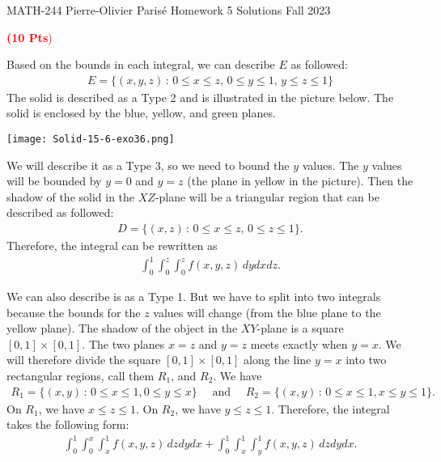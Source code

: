 \documentclass[12pt]{article}
\newcommand{\spc}{\vspace*{0.5cm}}
\newcommand{\exo}[3]{\noindent\textcolor{red}{\fbox{\textbf{Section {#1}, Problem {#2}}}\hrulefill   \textbf{({#3} Pts})}\vspace*{10pt}}
\begin{document}
\thispagestyle{empty}
	\noindent \hrulefill \newline
	MATH-244 \hfill Pierre-Olivier Paris{\'e}\newline
	Homework 5 Solutions \hfill Fall 2023\newline \vspace*{-0.7cm}
	
	\noindent\hrulefill
	
	\spc
	
	\exo{15.6}{36}{10}

	Based on the bounds in each integral, we can describe $E$ as followed:
		\begin{align*}
		E = \{ (x, y ,z) \, : \, 0 \leq x \leq z , \, 0 \leq y \leq 1 , \, y \leq z \leq 1 \}
		\end{align*} 
	The solid is described as a Type 2 and is illustrated in the picture below. The solid is enclosed by the blue, yellow, and green planes.
	\begin{center}
		\texttt{[image: Solid-15-6-exo36.png]}
	\end{center}

	We will describe it as a Type 3, so we need to bound the $y$ values. The $y$ values will be bounded by $y = 0$ and $y = z$ (the plane in yellow in the picture). Then the shadow of the solid in the $XZ$-plane will be a triangular region that can be described as followed: 
		\begin{align*}
		D = \{ (x, z) \, : \, 0 \leq x \leq z , \, 0 \leq z \leq 1 \} .
		\end{align*} 
	Therefore, the integral can be rewritten as
		\begin{align*}
		\int_0^1 \int_0^z \int_0^z f (x, y, z) \, dy dx dz .
		\end{align*}

	We can also describe is as a Type 1. But we have to split into two integrals because the bounds for the $z$ values will change (from the blue plane to the yellow plane). The shadow of the object in the $XY$-plane is a square $[0, 1] \times [0, 1]$. The two planes $x = z$ and $y = z$ meets exactly when $y = x$. We will therefore divide the square $[0, 1] \times [0 , 1]$ along the line $y =x$ into two rectangular regions, call them $R_1$, and $R_2$. We have
		\begin{align*}
		R_1 = \{ (x, y) \, : \, 0 \leq x \leq 1 , 0 \leq y \leq x \} \quad \text{ and } \quad R_2 = \{ (x, y) \, : \, 0 \leq x \leq 1 , x \leq y \leq 1 \} .
		\end{align*} 
	On $R_1$, we have $x \leq z \leq 1$. On $R_2$, we have $y \leq z \leq 1$. Therefore, the integral takes the following form:
		\begin{align*}
		\int_0^1 \int_0^x \int_x^1 f (x, y, z) \, dz dy dx + \int_0^1 \int_x^1 \int_y^1 f (x, y, z) \, dz dy dx .
		\end{align*}
	
\end{document}
